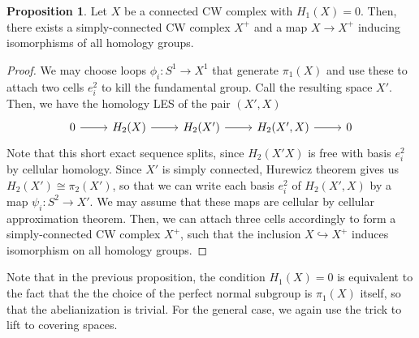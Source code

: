 \documentclass{article}
\theoremstyle{definition}
\theoremstyle{definition}
\theoremstyle{definition}
\theoremstyle{definition}
\newtheorem{proposition}{Proposition}[theorem]
\theoremstyle{definition}
\theoremstyle{definition}
\theoremstyle{definition}
\begin{document}
\begin{tcolorbox}[colback=blue!5!white,colframe=blue!30!white]
\begin{proposition}
    Let $X$ be a connected CW complex with $H_1(X)=0$. Then, there exists a simply-connected CW complex $X^+$ and a map $X\xrightarrow{}X^+$ inducing isomorphisms of all homology groups.
\end{proposition}
\end{tcolorbox}
\begin{proof}
We may choose loops $\phi_i:S^1\xrightarrow{}X^1$ that generate $\pi_1(X)$ and use these to attach two cells $e_i^2$ to kill the fundamental group. Call the resulting space $X'$. Then, we have the homology LES of the pair $(X',X)$
\[
\begin{tikzcd}
0\arrow[r]&H_2(X)\arrow[r]&H_2(X')\arrow[r]&H_2(X',X)\arrow[r]&0
\end{tikzcd}
\]
Note that this short exact sequence splits, since $H_2(X'X)$ is free with basis $e_i^2$ by cellular homology. Since $X'$ is simply connected, Hurewicz theorem gives us $H_2(X')\cong \pi_2(X')$, so that we can write each basis $e_i^2$ of $H_2(X',X)$ by a map $\psi_i:S^2\xrightarrow{}X'$. We may assume that these maps are cellular by cellular approximation theorem. Then, we can attach three cells accordingly to form a simply-connected CW complex $X^+$, such that the inclusion $X\hookrightarrow X^+$ induces isomorphism on all homology groups. 
\end{proof}
Note that in the previous proposition, the condition $H_1(X)=0$ is equivalent to the fact that the the choice of the perfect normal subgroup is $\pi_1(X)$ itself, so that the abelianization is trivial. For the general case, we again use the trick to lift to covering spaces. 
\end{document}
